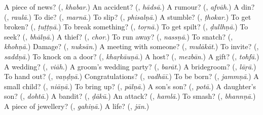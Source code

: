 \begin{tcolorbox}[breakable,colback=teal!4,colframe=teal!35!black,title={Before you move on}]
A piece of news? (\textbf{}, \emph{khabar}.) An accident? (\textbf{}, \emph{hādsā}.) A rumour? (\textbf{}, \emph{afvāh}.) A din? (\textbf{}, \emph{raulā}.) To die? (\textbf{}, \emph{marnā}.) To slip? (\textbf{}, \emph{phisalṇā}.) A stumble? (\textbf{}, \emph{ṭhokar}.) To get broken? (\textbf{}, \emph{ṭuṭṭṇā}.) To break something? (\textbf{}, \emph{toṛnā}.) To get spilt? (\textbf{}, \emph{ḍullhṇā}.) To seek? (\textbf{}, \emph{bhālṇā}.) A thief? (\textbf{}, \emph{chor}.) To run away? (\textbf{}, \emph{nassṇā}.) To snatch? (\textbf{}, \emph{khohṇā}.) Damage? (\textbf{}, \emph{nuksān}.) A meeting with someone? (\textbf{}, \emph{mulākāt}.) To invite? (\textbf{}, \emph{saddṇā}.) To knock on a door? (\textbf{}, \emph{khaṛkāuṇā}.) A host? (\textbf{}, \emph{mezbān}.) A gift? (\textbf{}, \emph{tohfā}.) A wedding? (\textbf{}, \emph{viāh}.) A groom's wedding party? (\textbf{}, \emph{barāt}.) A bridegroom? (\textbf{}, \emph{lāṛā}.) To hand out? (\textbf{}, \emph{vaṇḍṇā}.) Congratulations? (\textbf{}, \emph{vadhāī}.) To be born? (\textbf{}, \emph{jammṇā}.) A small child? (\textbf{}, \emph{niāṇā}.) To bring up? (\textbf{}, \emph{pālṇā}.) A son's son? (\textbf{}, \emph{potā}.) A daughter's son? (\textbf{}, \emph{dohtā}.) A bandit? (\textbf{}, \emph{ḍākū}.) An attack? (\textbf{}, \emph{hamlā}.) To smash? (\textbf{}, \emph{bhannṇā}.) A piece of jewellery? (\textbf{}, \emph{gahiṇā}.) A life? (\textbf{}, \emph{jān}.)
\end{tcolorbox}
